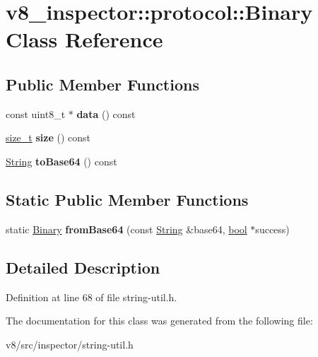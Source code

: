 \hypertarget{classv8__inspector_1_1protocol_1_1Binary}{}\section{v8\+\_\+inspector\+:\+:protocol\+:\+:Binary Class Reference}
\label{classv8__inspector_1_1protocol_1_1Binary}
\subsection*{Public Member Functions}
\begin{DoxyCompactItemize}
\item 
\mbox{\label{classv8__inspector_1_1protocol_1_1Binary_a72c07996f74b10efc095937a871029f0}} 
const uint8\+\_\+t $\ast$ {\bfseries data} () const
\item 
\mbox{\label{classv8__inspector_1_1protocol_1_1Binary_a3ae201f91bee63e476177840cb2c5875}} 
\mbox{\hyperlink{classsize__t}{size\+\_\+t}} {\bfseries size} () const
\item 
\mbox{\label{classv8__inspector_1_1protocol_1_1Binary_ab3aa3e5f78b5c392d1eaa26b97d1d682}} 
\mbox{\hyperlink{classv8__inspector_1_1String16}{String}} {\bfseries to\+Base64} () const
\end{DoxyCompactItemize}
\subsection*{Static Public Member Functions}
\begin{DoxyCompactItemize}
\item 
\mbox{\label{classv8__inspector_1_1protocol_1_1Binary_a99e1ec8867c6f70bab8854aeccf7bdbc}} 
static \mbox{\hyperlink{classv8__inspector_1_1protocol_1_1Binary}{Binary}} {\bfseries from\+Base64} (const \mbox{\hyperlink{classv8__inspector_1_1String16}{String}} \&base64, \mbox{\hyperlink{classbool}{bool}} $\ast$success)
\end{DoxyCompactItemize}


\subsection{Detailed Description}


Definition at line 68 of file string-\/util.\+h.



The documentation for this class was generated from the following file\+:\begin{DoxyCompactItemize}
\item 
v8/src/inspector/string-\/util.\+h\end{DoxyCompactItemize}

